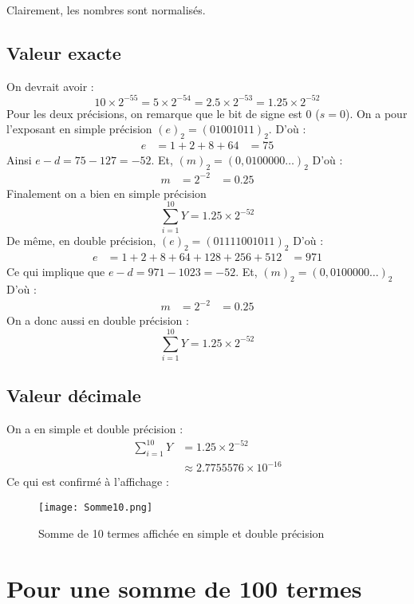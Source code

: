 \documentclass[a4paper, titlepage]{livret} %
\begin{document}
				Clairement, les nombres sont normalisés.

			\subsection{Valeur exacte}
				On devrait avoir :
				\[
					10\times2^{-55} = 5\times2^{-54} = 2.5\times2^{-53} = 1.25\times2^{-52} 
				\]
				Pour les deux précisions, on remarque que le bit de signe est $0$ ($s = 0$).
				On a pour l'exposant en simple précision $(e)_{2} = (01001011)_{2}$.
				D'où :
				\[\begin{aligned}
					e & = 1 + 2 + 8 + 64
					  & = 75
				\end{aligned}\]
				Ainsi $e - d = 75 - 127 = -52$.
				Et, $(m)_{2} = (0,0100000…)_{2}$
				D'où :
				\[\begin{aligned}
					m & = 2^{-2}
					  & = 0.25
				\end{aligned}\]
				Finalement on a bien en simple précision
				\[
					\sum_{i=1}^{10} Y = 1.25\times2^{-52}
				\]
				De même, en double précision, $(e)_{2} = (01111001011)_{2}$
				D'où :
				\[\begin{aligned}
					e & = 1 + 2 + 8 + 64 + 128 + 256 + 512
					  & = 971
				\end{aligned}\]
				Ce qui implique que $e - d = 971 - 1023 = -52$.
				Et, $(m)_{2} = (0,0100000…)_{2}$
				D'où :
				\[\begin{aligned}
					m & = 2^{-2}
					  & = 0.25
				\end{aligned}\]
				On a donc aussi en double précision :
				\[
					\sum_{i=1}^{10} Y = 1.25\times2^{-52}
				\]

			\subsection{Valeur décimale}
				On a en simple et double précision :
				\[\begin{aligned}
					\sum_{i=1}^{10} Y & = 1.25\times2^{-52}\\
									 & \approx 2.7755576\times10^{-16}
				\end{aligned}\]
				Ce qui est confirmé à l'affichage :
				\begin{figure}[!h]
					\centering
  						\texttt{[image: Somme10.png]}
  						\caption{Somme de 10 termes affichée en simple et double précision}
				\end{figure}
				\newpage

		\section{Pour une somme de 100 termes}
\end{document}
